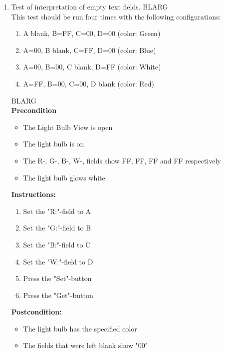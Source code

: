 \documentclass[a4paper]{article}
\newlength{\testlabellength}
\newenvironment{testlist}{\begin{enumerate}[label=\bfseries Instruction \thesubsection.\arabic* , labelindent=0pt, labelwidth=\testlabellength , leftmargin=2cm]}{\end{enumerate}}
\newenvironment{config}[1][2]{
{\color{white}BLARG}\\ 
This test should be run #1 times with the following configurations:
\begin{enumerate}[label=\bfseries  \arabic*., labelindent=0cm, labelwidth=2cm , leftmargin=1cm]
}
{\end{enumerate}}
\newenvironment{precondition}{
{\color{white}BLARG}\\ 
\textbf{Precondition}
\begin{itemize}[labelindent=0cm, labelwidth=2cm , leftmargin=1cm]
}
{\end{itemize}}
\newenvironment{instruction}{
\textbf{Instructions:}
\begin{enumerate}[label=\bfseries  \arabic*., labelindent=0cm, labelwidth=2cm , leftmargin=1cm]
}
{\end{enumerate}}
\newenvironment{postcondition}{
\textbf{Postcondition:}
\begin{itemize}[labelindent=0cm, labelwidth=2cm , leftmargin=1cm]
}
{\end{itemize}}
\begin{document}
\begin{appendices}
\begin{testlist}
	\item Test of interpretation of empty text fields.
    	\begin{config}[four]
			\item A blank, B=FF, C=00, D=00 (color: Green)
			\item A=00, B blank, C=FF, D=00 (color: Blue)
			\item A=00, B=00, C blank, D=FF (color: White)
			\item A=FF, B=00, C=00, D blank (color: Red)
		\end{config}
		\begin{precondition}
			\item The Light Bulb View is open
			\item The light bulb is on
			\item The R-, G-, B-, W-, fields show FF, FF, FF and FF respectively
			\item The light bulb glows white
		\end{precondition}
		\begin{instruction}
			\item Set the "R:"-field to A
			\item Set the "G:"-field to B
			\item Set the "B:"-field to C
			\item Set the "W:"-field to D
			\item Press the "Set"-button
			\item Press the "Get"-button
		\end{instruction}
		\begin{postcondition}
			\item The light bulb has the specified color
			\item The fields that were left blank show "00"
		\end{postcondition}
		


\end{testlist}
\end{appendices}
\end{document}
